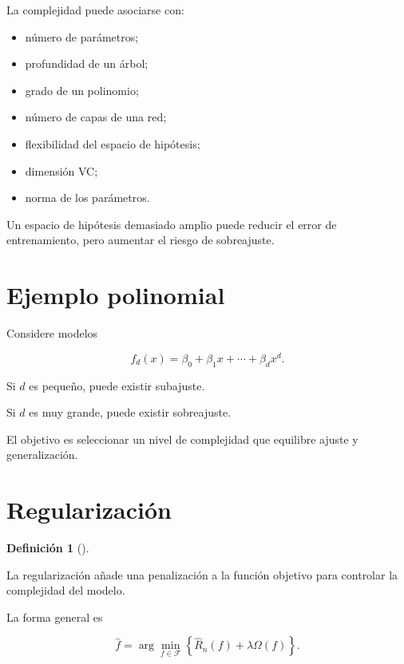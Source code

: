 \documentclass[
  spanish,
  10.5pt,
  letterpaper,
  DIV=11,
  numbers=noendperiod,
  oneside,
  open=any]{scrreprt}
\providecommand{\tightlist}{%
  \setlength{\itemsep}{0pt}\setlength{\parskip}{0pt}}
\theoremstyle{definition}
\newtheorem{definition}{Definición}[chapter]
\theoremstyle{definition}
\theoremstyle{plain}
\theoremstyle{remark}
\begin{document}
La complejidad puede asociarse con:

\begin{itemize}
\tightlist
\item
  número de parámetros;
\item
  profundidad de un árbol;
\item
  grado de un polinomio;
\item
  número de capas de una red;
\item
  flexibilidad del espacio de hipótesis;
\item
  dimensión VC;
\item
  norma de los parámetros.
\end{itemize}

Un espacio de hipótesis demasiado amplio puede reducir el error de
entrenamiento, pero aumentar el riesgo de sobreajuste.

\section*{Ejemplo polinomial}\label{ejemplo-polinomial}


Considere modelos

\[
f_d(x)
=
\beta_0+\beta_1x+\cdots+\beta_dx^d.
\]

Si \(d\) es pequeño, puede existir subajuste.

Si \(d\) es muy grande, puede existir sobreajuste.

El objetivo es seleccionar un nivel de complejidad que equilibre ajuste
y generalización.

\section*{Regularización}\label{regularizaciuxf3n-1}


\begin{definition}[]\protect\hypertarget{def-regularizacion}{}\label{def-regularizacion}

La regularización añade una penalización a la función objetivo para
controlar la complejidad del modelo.

\end{definition}

La forma general es

\[
\widehat{f}
=
\arg\min_{f\in\mathcal{F}}
\left\{
\widehat{R}_n(f)
+
\lambda\Omega(f)
\right\}.
\]
\end{document}
